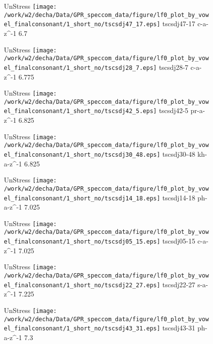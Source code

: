 \documentclass{article}
\begin{document}
\begin{figure}[t]
\begin{minipage}[b]{.24\textwidth}
UnStress
\centering
\texttt{[image: /work/w2/decha/Data/GPR\_speccom\_data/figure/lf0\_plot\_by\_vowel\_finalconsonant/1\_short\_no/tscsdj47\_17.eps]}
tscsdj47-17 c-a-z\textasciicircum-1 6.7
\end{minipage}
\begin{minipage}[b]{.24\textwidth}
UnStress
\centering
\texttt{[image: /work/w2/decha/Data/GPR\_speccom\_data/figure/lf0\_plot\_by\_vowel\_finalconsonant/1\_short\_no/tscsdj28\_7.eps]}
tscsdj28-7 c-a-z\textasciicircum-1 6.775
\end{minipage}
\begin{minipage}[b]{.24\textwidth}
UnStress
\centering
\texttt{[image: /work/w2/decha/Data/GPR\_speccom\_data/figure/lf0\_plot\_by\_vowel\_finalconsonant/1\_short\_no/tscsdj42\_5.eps]}
tscsdj42-5 pr-a-z\textasciicircum-1 6.825
\end{minipage}
\begin{minipage}[b]{.24\textwidth}
UnStress
\centering
\texttt{[image: /work/w2/decha/Data/GPR\_speccom\_data/figure/lf0\_plot\_by\_vowel\_finalconsonant/1\_short\_no/tscsdj30\_48.eps]}
tscsdj30-48 kh-a-z\textasciicircum-1 6.825
\end{minipage}
\end{figure}

\begin{figure}[t]
\begin{minipage}[b]{.24\textwidth}
UnStress
\centering
\texttt{[image: /work/w2/decha/Data/GPR\_speccom\_data/figure/lf0\_plot\_by\_vowel\_finalconsonant/1\_short\_no/tscsdj14\_18.eps]}
tscsdj14-18 ph-a-z\textasciicircum-1 7.025
\end{minipage}
\begin{minipage}[b]{.24\textwidth}
UnStress
\centering
\texttt{[image: /work/w2/decha/Data/GPR\_speccom\_data/figure/lf0\_plot\_by\_vowel\_finalconsonant/1\_short\_no/tscsdj05\_15.eps]}
tscsdj05-15 c-a-z\textasciicircum-1 7.025
\end{minipage}
\begin{minipage}[b]{.24\textwidth}
UnStress
\centering
\texttt{[image: /work/w2/decha/Data/GPR\_speccom\_data/figure/lf0\_plot\_by\_vowel\_finalconsonant/1\_short\_no/tscsdj22\_27.eps]}
tscsdj22-27 s-a-z\textasciicircum-1 7.225
\end{minipage}
\begin{minipage}[b]{.24\textwidth}
UnStress
\centering
\texttt{[image: /work/w2/decha/Data/GPR\_speccom\_data/figure/lf0\_plot\_by\_vowel\_finalconsonant/1\_short\_no/tscsdj43\_31.eps]}
tscsdj43-31 ph-a-z\textasciicircum-1 7.3
\end{minipage}
\end{figure}
\end{document}
